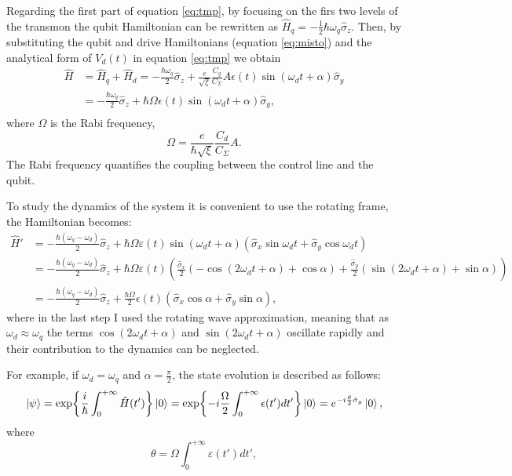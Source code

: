 Regarding the first part of equation \ref{eq:tmp}, by focusing on the firs two levels of the transmon the qubit Hamiltonian can be rewritten as $\hat{H}_q = -\frac{1}{2}\hbar\omega_q\hat{\sigma}_z$.
Then, by substituting the qubit and drive Hamiltonians (equation \ref{eq:misto}) and the analytical form of $V_d(t)$ in equation \ref{eq:tmp} we obtain
\begin{align}
    \hat{H} &= \hat{H}_q + \hat{H}_d = -\frac{\hbar \omega_q}{2} \hat{\sigma}_z + \frac{e}{\sqrt{\xi}} \frac{C_g}{C_{\Sigma}} A \epsilon(t) \sin(\omega_d t + \alpha) \hat{\sigma}_y\\
    &= -\frac{\hbar \omega_q}{2} \hat{\sigma}_z + \hbar \Omega \epsilon(t) \sin(\omega_d t + \alpha) \hat{\sigma}_y, \\ \label{eq:interaction_hamiltonian}
\end{align} 
where $\Omega$ is the Rabi frequency, 
\begin{equation}\label{eq:Rabi_frequency}
    \Omega = \frac{e}{\hbar\sqrt{\xi}}\frac{C_d}{C_\Sigma}A.
\end{equation}
The Rabi frequency quantifies the coupling between the control line and the qubit.

To study the dynamics of the system it is convenient to use the rotating frame, the Hamiltonian becomes: %
\begin{align}
    \hat{H}' &= -\frac{\hbar (\omega_q - \omega_d)}{2} \hat{\sigma}_z + \hbar \Omega \varepsilon(t) \sin(\omega_d t + \alpha)\left( \hat{\sigma}_x \sin \omega_d t + \hat{\sigma}_y \cos \omega_d t \right)\\
    &= -\frac{\hbar (\omega_q - \omega_d)}{2} \hat{\sigma}_z + \hbar \Omega \varepsilon(t)\left(\frac{\hat{\sigma}_x}{2} \left( -\cos(2\omega_d t + \alpha) + \cos \alpha \right) + \frac{\hat{\sigma}_y}{2} \left( \sin(2\omega_d t + \alpha) + \sin \alpha \right)\right)\\
    &=  -\frac{\hbar (\omega_q - \omega_d)}{2} \hat{\sigma}_z + \frac{\hbar \Omega}{2} \epsilon(t) \left( \hat{\sigma}_x \cos \alpha + \hat{\sigma}_y \sin \alpha \right),
\end{align}
where in the last step I used the rotating wave approximation, meaning that as $\omega_d\approx\omega_q$ the terms $\cos(2\omega_d t + \alpha)$ and $\sin(2\omega_d t + \alpha)$ oscillate rapidly and their contribution to the dynamics can be neglected.

For example, if $\omega_d = \omega_q$ and $\alpha=\frac{\pi}{2}$, the state evolution is described as follows:
\begin{align}
    \ket{\psi} = \exp{\frac{i}{\hbar}\int_{0}^{+\infty} \hat{H}(t')}\ket{0} = \exp{-i\frac{\Omega}{2}\int_{0}^{+\infty}\epsilon(t')dt'}\ket{0} = e^{-i\frac{\theta}{2}\hat{\sigma}_y}\ket{0},
\end{align}
where
\begin{equation}
    \theta = \Omega\int_{0}^{+\infty}\varepsilon(t')dt',
\end{equation}

